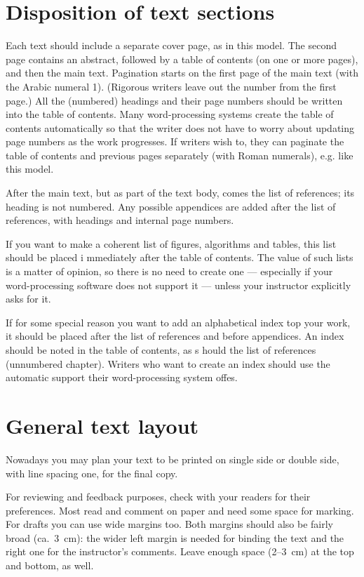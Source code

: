 \section{Disposition of text sections}


Each text should include a separate cover page, as in this model. The second page contains an 
abstract, followed by a table of contents (on one or more pages), and then the main text.  
Pagination starts on the first page of the main text (with the Arabic numeral 1). (Rigorous writers 
leave out the number from the first page.) All the (numbered) headings and their page numbers should be 
written into the table of contents. Many word-processing systems create the table of contents automatically 
so that the writer does not have to worry about updating page numbers as the work progresses. If writers 
wish to, they can paginate the table of contents and previous pages separately (with Roman numerals), e.g. like this model.

After the main text, but as part of the text body, comes the list of references; its heading is 
not numbered. Any possible appendices are added after the list of references, with headings and internal page numbers.


If you want to make a coherent list of figures, algorithms and tables, this list should be placed i
mmediately after the table of contents. The value of such lists is a matter of opinion, so there 
is no need to create one --- especially if your word-processing software does not support it --- unless your instructor explicitly asks for it.

If for some special reason you want to add an alphabetical index top your work, it should be placed after 
the list of references and before appendices. An index should be noted in the table of contents, as s
hould the list of references (unnumbered chapter). Writers who want to create an index should use the automatic support their word-processing system offes.

\section{General text layout}

Nowadays you may plan your text to be printed on single side or double
side, with line spacing one, for the final copy.

For reviewing and feedback purposes, check with your readers for their
preferences. Most read and comment on paper and need some space for
marking. 
For drafts you can use wide margins too. 
Both margins should also be fairly broad (ca.~3~cm): the wider left margin is needed for binding the text and the
right one for the instructor's comments.  Leave enough space (2--3~cm) at the top and bottom, as well.

